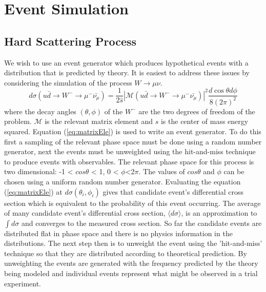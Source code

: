 \chapter{Event Simulation}
\section{Hard Scattering Process}
We wish to use an event generator which produces hypothetical events with a distribution
that is predicted by theory.
It is easiest to address these issues by considering the simulation of 
the process $W\rightarrow\mu\nu$. 
\begin{equation}
d\sigma(u\bar{d}\rightarrow W^{-}\rightarrow \mu^{-}\bar{\nu_{\mu}})
=\frac{1}{2\hat{s}}|\mathcal{M}(u\bar{d}\rightarrow W^{-}\rightarrow \mu^{-}\bar{\nu_{\mu}})|^{2}
\frac{d\cos\theta d\phi}{8(2\pi)^{2}}
\label{eq:matrixEle}
\end{equation}
where the decay angles $(\theta,\phi)$ of the $W^{-}$ are the two degrees of
freedom of the problem. $\mathcal{M}$ is the relevant matrix element and $\hat{s}$
is the center of mass energy squared.
Equation (\ref{eq:matrixEle}) is used to write an event generator. 
To do this first a sampling of the relevant phase
space must be done using a random number generator, next the events must
be unweighted using the hit-and-miss technique to produce events with observables. %
The relevant phase space for this process is two dimensional: -1 < $cos\theta$ < 1,
0 < $\phi$<2$\pi$. The values of $cos\theta$ and $\phi$ can be chosen using
a uniform random number generator. 
Evaluating the equation (\ref{eq:matrixEle}) at $d\sigma(\theta_{i},\phi_{i})$ gives
that candidate event's differential cross section which is equivalent to the 
probability of this event occurring. The average of many candidate event's differential
cross section, $\langle d\sigma\rangle$, is an approximation to $\int d\sigma$ and converges
to the measured cross section.
So far the candidate events are distributed flat in phase space and there is 
no physics information in the distributions.
The next step then is to unweight the event using the 'hit-and-miss' technique
so that they are distributed according to theoretical prediction. By unweighting
the events are generated with the frequency predicted by the theory 
being modeled and individual events represent what might be observed in a
trial experiment. 


